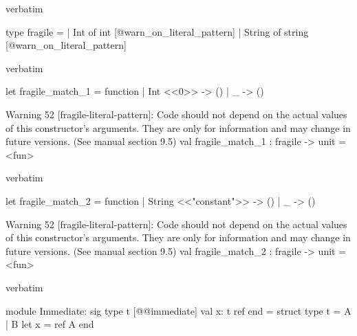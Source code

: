 \begin{camlexample}{verbatim}
\begin{caml}
\begin{camlinput}
type fragile =
  | Int of int [@warn_on_literal_pattern]
  | String of string [@warn_on_literal_pattern]
\end{camlinput}
\end{caml}
\end{camlexample}

\begin{camlexample}{verbatim}
\begin{caml}
\begin{camlinput}
let fragile_match_1 = function
| Int <<0>> -> ()
| _ -> ()
\end{camlinput}
\begin{camlwarn}
Warning 52 [fragile-literal-pattern]: Code should not depend on the actual values of
this constructor's arguments. They are only for information
and may change in future versions. (See manual section 9.5)
val fragile_match_1 : fragile -> unit = <fun>
\end{camlwarn}
\end{caml}
\end{camlexample}

\begin{camlexample}{verbatim}
\begin{caml}
\begin{camlinput}
let fragile_match_2 = function
| String <<"constant">> -> ()
| _ -> ()
\end{camlinput}
\begin{camlwarn}
Warning 52 [fragile-literal-pattern]: Code should not depend on the actual values of
this constructor's arguments. They are only for information
and may change in future versions. (See manual section 9.5)
val fragile_match_2 : fragile -> unit = <fun>
\end{camlwarn}
\end{caml}
\end{camlexample}

\begin{camlexample}{verbatim}
\begin{caml}
\begin{camlinput}
module Immediate: sig
  type t [@@immediate]
  val x: t ref
end = struct
  type t = A | B
  let x = ref A
end
\end{camlinput}
\end{caml}
\end{camlexample}

